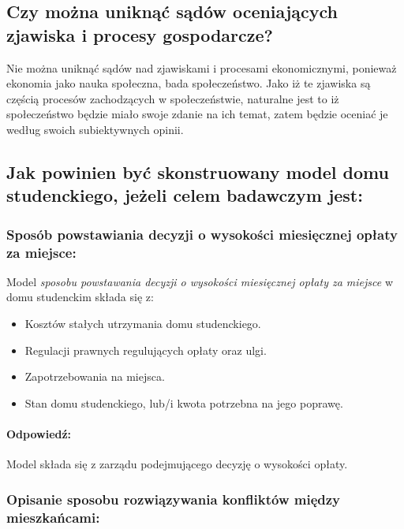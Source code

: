 \documentclass[a4paper,12pt]{article}
\newcommand{\twierdzonko}[1]{
        \begin{center}
        \begin{mdframed}
        #1
        \end{mdframed}          
        \end{center}
    }
\begin{document}
\subsection{Czy można uniknąć sądów oceniających zjawiska i procesy gospodarcze?}

Nie można uniknąć sądów nad zjawiskami i procesami ekonomicznymi, ponieważ ekonomia jako nauka społeczna, bada społeczeństwo. Jako iż te zjawiska są częścią procesów zachodzących w społeczeństwie, naturalne jest to iż społeczeństwo będzie miało swoje zdanie na ich temat, zatem będzie oceniać je według swoich subiektywnych opinii.

\subsection{Jak powinien być skonstruowany model domu studenckiego, jeżeli celem badawczym jest:}

\subsubsection*{Sposób powstawiania decyzji o wysokości miesięcznej opłaty za miejsce:}

Model \emph{sposobu powstawania decyzji o wysokości miesięcznej opłaty za miejsce} w domu studenckim składa się z:

\begin{itemize}
	\item Kosztów stałych utrzymania domu studenckiego.
	\item Regulacji prawnych regulujących opłaty oraz ulgi.
	\item Zapotrzebowania na miejsca.
	\item Stan domu studenckiego, lub/i kwota potrzebna na jego poprawę.
\end{itemize}

\twierdzonko{\paragraph{Odpowiedź:}
	Model składa się z zarządu podejmującego decyzję o wysokości opłaty.

	\vspace{0.6cm}
}

\subsubsection*{Opisanie sposobu rozwiązywania konfliktów między mieszkańcami:}
\end{document}
